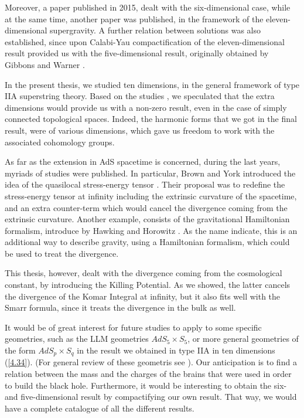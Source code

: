 \documentclass[a4paper,notitlepage]{report}
\begin{document}
Moreover, a paper published in 2015, \cite{de2015structure} dealt with the six-dimensional case, while at the same time, another paper \cite{haas2014smarr} was published, in the framework of the eleven-dimensional supergravity. A further relation between solutions was also established, since upon Calabi-Yau compactification of the eleven-dimensional result provided us with the five-dimensional result, originally obtained by Gibbons and Warner \cite{gibbonsglobal}.
 
In the present thesis, we studied ten dimensions, in the general framework of type IIA superstring theory. Based on the studies \cite{gibbonsglobal,de2015structure,haas2014smarr}, we speculated that the extra dimensions would provide us with a non-zero result, even in the case of simply connected topological spaces. Indeed, the harmonic forms that we got in the final result, were of various dimensions, which gave us freedom to work with the associated cohomology groups.

As far as the extension in AdS spacetime is concerned, during the last years, myriads of studies were published. In particular, Brown and York introduced the idea of the quasilocal stress-energy tensor \cite{brown1993quasilocal,balasubramanian1999stress}. Their proposal was to redefine the stress-energy tensor at infinity including the extrinsic curvature of the spacetime, and an extra counter-term which would cancel the divergence coming from the extrinsic curvature. Another example, consists of the gravitational Hamiltonian formalism, introduce by Hawking and Horowitz \cite{hawking1996gravitational}. As the name indicate, this is an additional way to describe gravity, using a Hamiltonian formalism, which could be used to treat the divergence. 

This thesis, however, dealt with the divergence coming from the cosmological constant, by introducing the Killing Potential. As we showed, the latter cancels the divergence of the Komar Integral at infinity, but it also fits well with the Smarr formula, since it treats the divergence in the bulk as well.

It would be of great interest for future studies to apply to some specific geometries, such as the LLM geometries $AdS_5 \times S_5$, or more general geometries of the form $AdS_p \times S_q$ in the result we obtained in type IIA in ten dimensions (\ref{4.34}). (For general review of these geometris see \cite{lin2004bubbling,yamaguchi2007bubbling}). Our anticipation is to find a relation between the mass and the charges of the brains that were used in order to build the black hole. Furthermore, it would be interesting to obtain the six- and five-dimensional result by compactifying our own result. That way, we would have a complete catalogue of all the different results.
\end{document}
